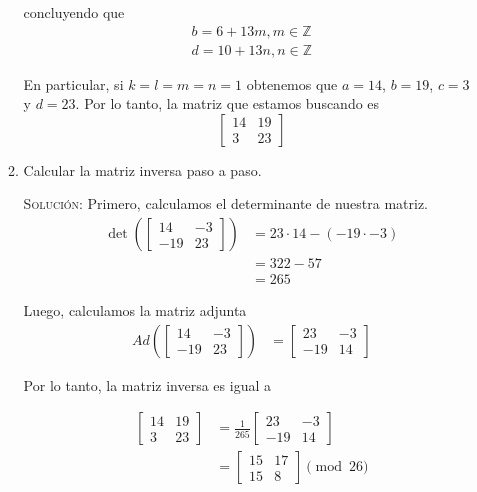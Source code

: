 \documentclass[letterpaper,11pt]{article}
\begin{document}
\begin{enumerate}
\begin{enumerate}
        concluyendo que 
        \begin{align*}
            b = 6 + 13m, m \in \mathbb{Z} \\
            d = 10 + 13n, n \in \mathbb{Z}
        \end{align*}
        
        En particular, si $k = l = m = n = 1$ obtenemos que $a = 14$, $b = 19$,
        $c = 3$ y $d = 23$. Por lo tanto, la matriz que estamos buscando es
        \begin{equation*}
            \begin{bmatrix} 14 & 19 \\ 3 & 23\end{bmatrix} 
        \end{equation*}

        \item Calcular la matriz inversa paso a paso.
        
        \textsc{Solución:} Primero, calculamos el determinante de nuestra 
        matriz.
        \begin{align*}
            \det \left(\begin{bmatrix} 14 & -3 \\ -19 & 23\end{bmatrix}\right)
            &= 23 \cdot 14 - (-19 \cdot -3) \\
            &= 322 - 57 \\
            &= 265
        \end{align*}
        
        Luego, calculamos la matriz adjunta
        \begin{align*}
            Ad \left(\begin{bmatrix} 14 & -3 \\ -19 & 23\end{bmatrix}\right)
            &= \begin{bmatrix} 23 & -3 \\ -19 & 14\end{bmatrix}
        \end{align*}
        
        Por lo tanto, la matriz inversa es igual a 

        \begin{align*}
            \begin{bmatrix} 14 & 19 \\ 3 & 23\end{bmatrix} 
            &= \frac{1}{265} \begin{bmatrix} 23 & -3 \\ -19 & 14\end{bmatrix} \\
            &= \begin{bmatrix} 15 & 17 \\ 15 & 8 \end{bmatrix} \pmod{26}
        \end{align*}
        

\end{enumerate}
\end{enumerate}
\end{document}
